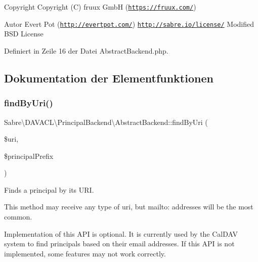 \begin{DoxyCopyright}{Copyright}
Copyright (C) fruux GmbH (\href{https://fruux.com/}{\tt https\+://fruux.\+com/}) 
\end{DoxyCopyright}
\begin{DoxyAuthor}{Autor}
Evert Pot (\href{http://evertpot.com/}{\tt http\+://evertpot.\+com/})  \href{http://sabre.io/license/}{\tt http\+://sabre.\+io/license/} Modified B\+SD License 
\end{DoxyAuthor}


Definiert in Zeile 16 der Datei Abstract\+Backend.\+php.



\subsection{Dokumentation der Elementfunktionen}
\mbox{\label{class_sabre_1_1_d_a_v_a_c_l_1_1_principal_backend_1_1_abstract_backend_a2ffb47954e7df053074c2f319e4e2c7e}} 
\subsubsection{\texorpdfstring{find\+By\+Uri()}{findByUri()}}
{\footnotesize\ttfamily Sabre\textbackslash{}\+D\+A\+V\+A\+C\+L\textbackslash{}\+Principal\+Backend\textbackslash{}\+Abstract\+Backend\+::find\+By\+Uri (\begin{DoxyParamCaption}\item[{}]{\$uri,  }\item[{}]{\$principal\+Prefix }\end{DoxyParamCaption})}

Finds a principal by its U\+RI.

This method may receive any type of uri, but mailto\+: addresses will be the most common.

Implementation of this A\+PI is optional. It is currently used by the Cal\+D\+AV system to find principals based on their email addresses. If this A\+PI is not implemented, some features may not work correctly.

